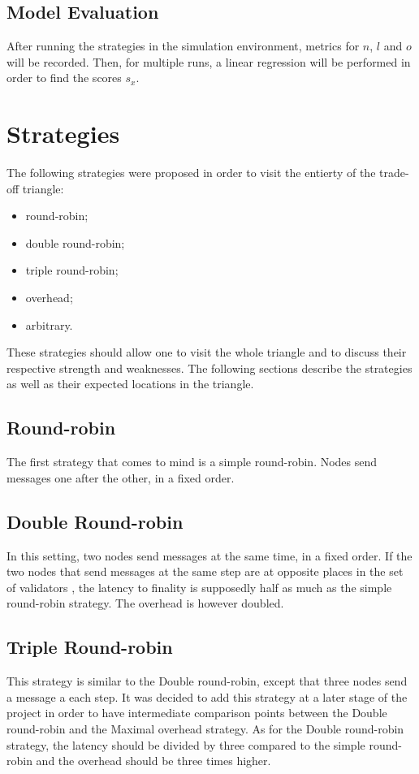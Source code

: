 \subsection{Model Evaluation}
After running the strategies in the simulation environment, metrics for \(n\),
\(l\) and \(o\) will be recorded. Then, for multiple runs, a linear regression
will be performed in order to find the scores \(s_x\).

\section{Strategies}
\label{sec:strategies}

The following strategies were proposed in order to visit the entierty of the
trade-off triangle:
\begin{itemize}
        \item round-robin;
        \item double round-robin;
        \item triple round-robin;
        \item overhead;
        \item arbitrary.
\end{itemize}
These strategies should allow one to visit the whole triangle and to discuss
their respective strength and weaknesses. The following sections describe the
strategies as well as their expected locations in the triangle.

\subsection{Round-robin}
The first strategy that comes to mind is a simple round-robin. Nodes send
messages one after the other, in a fixed order.


\subsection{Double Round-robin}
In this setting, two nodes send messages at the same time, in a fixed order. If
the two nodes that send messages at the same step are at opposite places in the
set of validators , the latency to finality is supposedly
half as much as the simple round-robin strategy. The overhead is however
doubled.

\subsection{Triple Round-robin}
This strategy is similar to the Double round-robin, except that three nodes send
a message a each step. It was decided to add this strategy at a later stage of
the project in order to have intermediate comparison points between the Double
round-robin and the Maximal overhead strategy. As for the Double round-robin
strategy, the latency should be divided by three compared to the simple
round-robin and the overhead should be three times higher.

